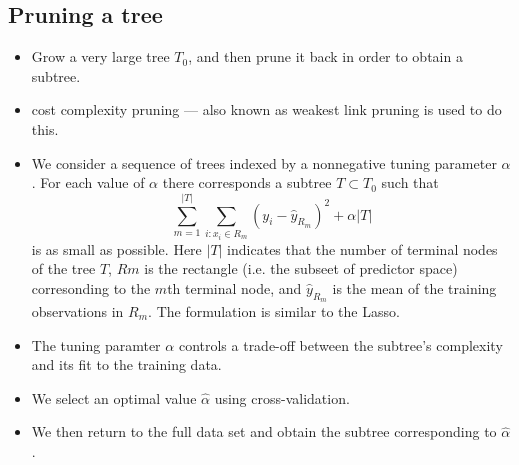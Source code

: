 \documentclass[11pt, a4paper]{article}
\begin{document}
\subsection{Pruning a tree}
\begin{itemize}
\item Grow a very large tree $T_0$, and then prune it back in order to obtain a subtree.
\item cost complexity pruning --- also known as weakest link pruning is used to do this.
\item We consider a sequence of trees indexed by a nonnegative tuning parameter $\alpha$. For each value of $\alpha$ there corresponds a subtree $T\subset T_0$ such that 
  \[
    \sum_{m=1}^{|T|}\sum_{i:x_i\in R_m}(y_i-\hat{y}_{R_m})^2+\alpha|T|
  \]
  is as small as possible. Here $|T|$ indicates that the number of terminal nodes of the tree $T$, $Rm$ is the rectangle (i.e. the subseet of predictor space) corresonding to the $m$th terminal node, and $\hat{y}_{R_m}$ is the mean of the training observations in $R_m$. The formulation is similar to the Lasso.
\item The tuning paramter $\alpha$ controls a trade-off between the subtree's complexity and its fit to the training data.
\item We select an optimal value $\hat{\alpha}$ using cross-validation.
\item We then return to the full data set and obtain the subtree corresponding to $\hat{\alpha}$.
\end{itemize}
\end{document}
